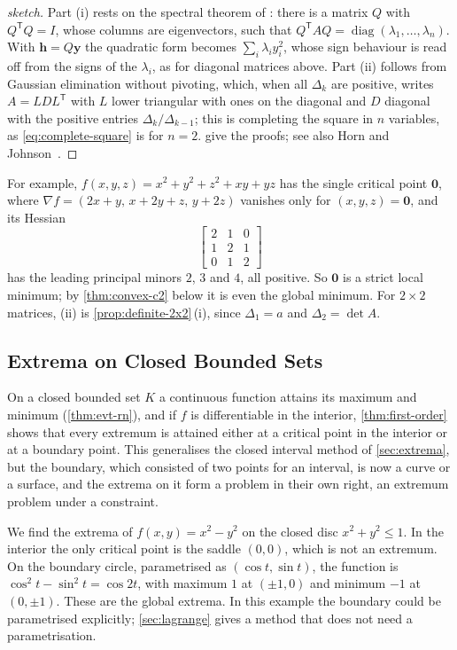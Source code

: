 \begin{proof}[sketch]
Part (i) rests on the spectral theorem of : there is a matrix $Q$ with $Q^{\mathsf T}Q=I$, whose columns are eigenvectors, such that $Q^{\mathsf T}AQ=\operatorname{diag}(\lambda_1,\ldots,\lambda_n)$. With $\mathbf h=Q\mathbf y$ the quadratic form becomes $\sum_i\lambda_iy_i^2$, whose sign behaviour is read off from the signs of the $\lambda_i$, as for diagonal matrices above. Part (ii) follows from Gaussian elimination without pivoting, which, when all $\Delta_k$ are positive, writes $A=LDL^{\mathsf T}$ with $L$ lower triangular with ones on the diagonal and $D$ diagonal with the positive entries $\Delta_k/\Delta_{k-1}$; this is completing the square in $n$ variables, as \eqref{eq:complete-square} is for $n=2$.  give the proofs; see also Horn and Johnson~\cite[Sects.~4.1 and~7.2]{horn2013}.
\end{proof}

For example, $f(x,y,z)=x^2+y^2+z^2+xy+yz$ has the single critical point $\mathbf0$, where $\nabla f=(2x+y,\,x+2y+z,\,y+2z)$ vanishes only for $(x,y,z)=\mathbf0$, and its Hessian
\[
\begin{bmatrix}2&1&0\\1&2&1\\0&1&2\end{bmatrix}
\]
has the leading principal minors $2$, $3$ and $4$, all positive. So $\mathbf0$ is a strict local minimum; by \cref{thm:convex-c2} below it is even the global minimum. For $2\times2$ matrices, (ii) is \cref{prop:definite-2x2}\,(i), since $\Delta_1=a$ and $\Delta_2=\det A$.

\subsection{Extrema on Closed Bounded Sets}

On a closed bounded set $K$ a continuous function attains its maximum and minimum (\cref{thm:evt-rn}), and if $f$ is differentiable in the interior, \cref{thm:first-order} shows that every extremum is attained either at a critical point in the interior or at a boundary point. This generalises the closed interval method of \cref{sec:extrema}, but the boundary, which consisted of two points for an interval, is now a curve or a surface, and the extrema on it form a problem in their own right, an extremum problem under a constraint.

We find the extrema of $f(x,y)=x^2-y^2$ on the closed disc $x^2+y^2\le1$. In the interior the only critical point is the saddle $(0,0)$, which is not an extremum. On the boundary circle, parametrised as $(\cos t,\sin t)$, the function is $\cos^2t-\sin^2t=\cos2t$, with maximum $1$ at $(\pm1,0)$ and minimum $-1$ at $(0,\pm1)$. These are the global extrema. In this example the boundary could be parametrised explicitly; \cref{sec:lagrange} gives a method that does not need a parametrisation.

